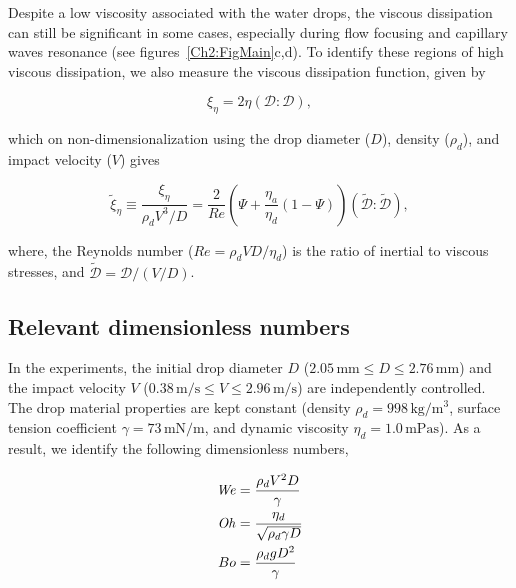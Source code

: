 \begin{subappendices}
	Despite a low viscosity associated with the water drops, the viscous dissipation can still be significant in some cases, especially during flow focusing and capillary waves resonance (see figures~\ref{Ch2:FigMain}c,d). To identify these regions of high viscous dissipation, we also measure the viscous dissipation function, given by \cite{landau2013course}
	
	\begin{equation}
		\xi_\eta = 2\eta \left({\boldsymbol{\mathcal{D}}:\boldsymbol{\mathcal{D}}}\right),
		\label{Ch2:Eqn::dissipation1}
	\end{equation}

	\noindent which on non-dimensionalization using the drop diameter ($D$), density ($\rho_d$), and impact velocity ($V$) gives
	
	\begin{equation}
		\tilde{\xi}_\eta \equiv \frac{\xi_\eta}{\rho_dV^3/D} = \frac{2}{Re}\left(\Psi + \frac{\eta_a}{\eta_d}\left(1-\Psi\right)\right)\left(\boldsymbol{\tilde{\mathcal{D}}:\tilde{\mathcal{D}}}\right),
		\label{Ch2:Eqn::dissipation2}
	\end{equation}

	\noindent where, the Reynolds number ($Re = \rho_d VD/\eta_d$) is the ratio of inertial to viscous stresses, and $\boldsymbol{\tilde{\mathcal{D}}} = \boldsymbol{\mathcal{D}}/(V/D)$. 
	
	\subsection{Relevant dimensionless numbers}
	
	In the experiments, the initial drop diameter $D$ ($2.05\,\si{\milli\meter} \le D \le 2.76\,\si{\milli\meter}$) and the impact velocity $V$ ($0.38\,\si{\meter}/\si{\second} \le V \le 2.96\,\si{\meter}/\si{\second}$) are independently controlled. The drop material properties are kept constant (density $\rho_d = 998\,\si{\kilogram}/\si{\meter}^{3}$, surface tension coefficient $\gamma = 73\,\si{\milli\newton}/\si{\meter}$, and dynamic viscosity $\eta_d = 1.0\,\si{\milli\pascal}\si{\second}$). As a result, we identify the following dimensionless numbers,
	
	\begin{align}
		\mathit{We} &= \frac{\rho_dV^2D}{\gamma} \\
		\mathit{Oh} &= \frac{\eta_d}{\sqrt{\rho_d\gamma D}}\\
		Bo &= \frac{\rho_dgD^2}{\gamma}
	\end{align}


\end{subappendices}
